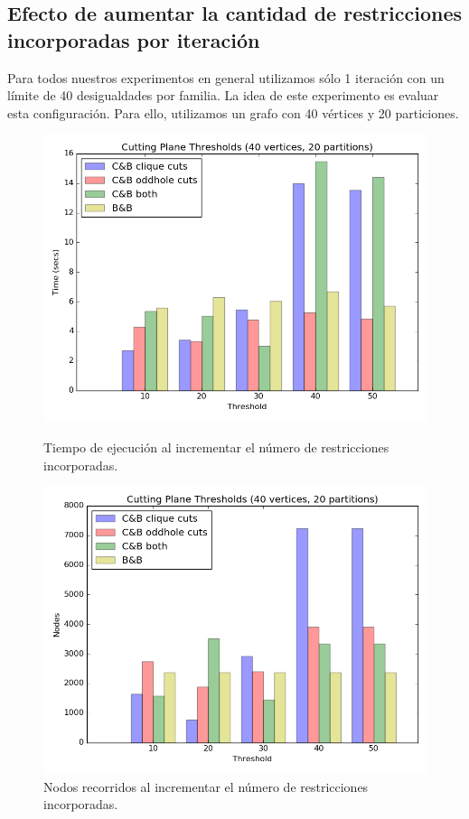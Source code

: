 \subsection{Efecto de aumentar la cantidad de restricciones incorporadas por iteración}

Para todos nuestros experimentos en general utilizamos sólo 1 iteración con un límite de 40 desigualdades por familia. La idea de este experimento es evaluar esta configuración. Para ello, utilizamos un grafo con 40 vértices y 20 particiones.

\begin{figure}[h]
  \centering
  \begin{minipage}[b]{0.49\textwidth}
    \includegraphics[width=\textwidth]{img/6-thresholds_v40_p20_i1_t1_b0.png}
    \caption{Tiempo de ejecución al incrementar el número de restricciones incorporadas.}
  \end{minipage}
  \hfill
  \begin{minipage}[b]{0.49\textwidth}
    \includegraphics[width=\textwidth]{img/6-thresholds_v40_p20_i1_co2_t1_b0_nodes.png}
    \caption{Nodos recorridos al incrementar el número de restricciones incorporadas.}
  \end{minipage}
\end{figure}

